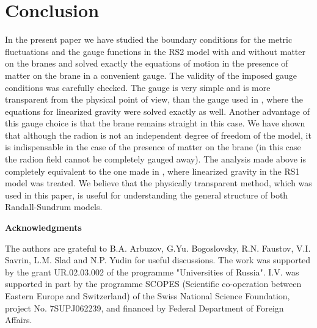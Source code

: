 \documentclass[a4paper,12pt]{article}
\begin{document}
\section{Conclusion}
In the present paper we have studied the boundary conditions for
the metric fluctuations and the gauge functions  in the RS2 model
with and without matter on the branes and  solved  exactly the
equations of motion in the presence of matter on the brane  in a
convenient gauge. The validity of the imposed gauge conditions
was carefully checked. The gauge is very simple and is more
transparent from the physical point of view,  than the gauge used
in \cite{AIMVV}, where the equations for linearized gravity were
solved exactly as well. Another advantage of this gauge choice is
that the  brane remains straight in this case. We have shown
that although the radion is not an independent degree of freedom
of the model, it is indispensable in the case of the presence of
matter on the brane (in this case the radion field cannot be
completely gauged away). The analysis made above is completely
equivalent to the one made in \cite{BKSV,SV}, where linearized
gravity in the RS1 model was treated. We believe that the physically
transparent method, which was used in this paper, is useful for
understanding the general structure of both  Randall-Sundrum models.


\bigskip
{ \large \bf Acknowledgments}
\medskip

The authors are grateful to B.A. Arbuzov, G.Yu. Bogoslovsky, R.N. Faustov,
V.I. Savrin, L.M. Slad and N.P. Yudin for useful discussions.  The work
was supported by  the grant  UR.02.03.002 of the programme "Universities of
Russia". I.V. was supported in part by the programme SCOPES (Scientific
co-operation between Eastern Europe and Switzerland) of the Swiss National
Science Foundation, project No. 7SUPJ062239, and financed by Federal
Department of Foreign Affairs.
\end{document}
